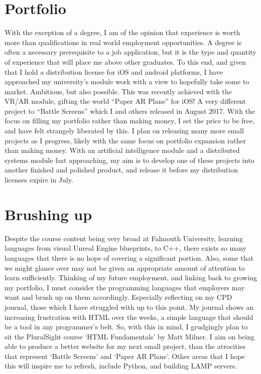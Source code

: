 \documentclass{scrartcl}
\begin{document}
\section*{Portfolio}

With the exception of a degree, I am of the opinion that experience is worth more than qualifications in real world employment opportunities. A degree is often a necessary prerequisite to a job application, but it is the type and quantity of experience that will place me above other graduates. To this end, and given that I hold a distribution license for iOS and android platforms, I have approached my university's module work with a view to hopefully take some to market. Ambitious, but also possible. This was recently achieved with the VR/AR module, gifting the world ``Paper AR Plane'' for iOS! A very different project to ``Battle Screens'' which I and others released in August 2017. With the focus on filling my portfolio rather than making money, I set the price to be free, and have felt strangely liberated by this. I plan on releasing many more small projects as I progress, likely with the same focus on portfolio expansion rather than making money. With an artificial intelligence module and a distributed systems module fast approaching, my aim is to develop one of these projects into another finished and polished product, and release it before my distribution licenses expire in July.

\section*{Brushing up}

Despite the course content being very broad at Falmouth University, learning languages from visual Unreal Engine blueprints, to C++, there exists so many languages that there is no hope of covering a significant portion. Also, some that we might glance over may not be given an appropriate amount of attention to learn sufficiently. Thinking of my future employment, and linking back to growing my portfolio, I must consider the programming languages that employers may want and brush up on them accordingly. Especially reflecting on my CPD journal, those which I have struggled with up to this point. My journal shows an increasing frustration with HTML over the weeks, a simple language that should be a tool in any programmer's belt. So, with this in mind, I grudgingly plan to sit the PluralSight course `HTML Fundamentals' by Matt Milner. I aim on being able to produce a better website for my next small project, than the atrocities that represent `Battle Screens' and `Paper AR Plane'. Other areas that I hope this will inspire me to refresh, include Python, and building LAMP servers.
\end{document}
